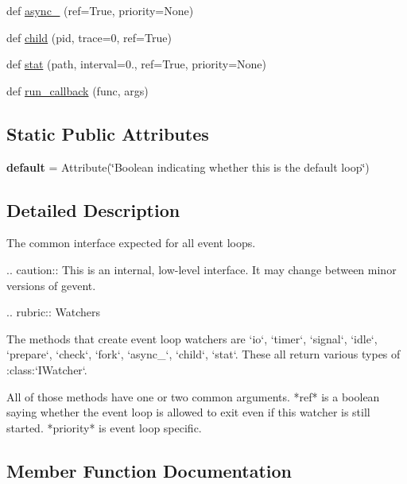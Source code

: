 \begin{DoxyCompactItemize}
\item 
def \hyperlink{classgevent_1_1__interfaces_1_1_i_loop_a6357e9929330e0a8b7bd600a8ad84afb}{async\+\_\+} (ref=True, priority=None)
\item 
def \hyperlink{classgevent_1_1__interfaces_1_1_i_loop_ac64946c90ea5c9eaebab62293013705a}{child} (pid, trace=0, ref=True)
\item 
def \hyperlink{classgevent_1_1__interfaces_1_1_i_loop_a8906af9ad6b57cb89d18a376221031e6}{stat} (path, interval=0., ref=True, priority=None)
\item 
def \hyperlink{classgevent_1_1__interfaces_1_1_i_loop_a56e64ac55f2f91b38cd415b57d4e37c5}{run\+\_\+callback} (func, args)
\end{DoxyCompactItemize}
\subsection*{Static Public Attributes}
\begin{DoxyCompactItemize}
\item 
\mbox{\label{classgevent_1_1__interfaces_1_1_i_loop_a3f323ce6330e9aafe057fbeb1472ed00}} 
{\bfseries default} = Attribute(\char`\"{}Boolean indicating whether this is the default loop\char`\"{})
\end{DoxyCompactItemize}


\subsection{Detailed Description}
\begin{DoxyVerb}The common interface expected for all event loops.

.. caution::
   This is an internal, low-level interface. It may change
   between minor versions of gevent.

.. rubric:: Watchers

The methods that create event loop watchers are `io`, `timer`,
`signal`, `idle`, `prepare`, `check`, `fork`, `async_`, `child`,
`stat`. These all return various types of :class:`IWatcher`.

All of those methods have one or two common arguments. *ref* is a
boolean saying whether the event loop is allowed to exit even if
this watcher is still started. *priority* is event loop specific.
\end{DoxyVerb}
 

\subsection{Member Function Documentation}
\mbox{\label{classgevent_1_1__interfaces_1_1_i_loop_a6357e9929330e0a8b7bd600a8ad84afb}} 
